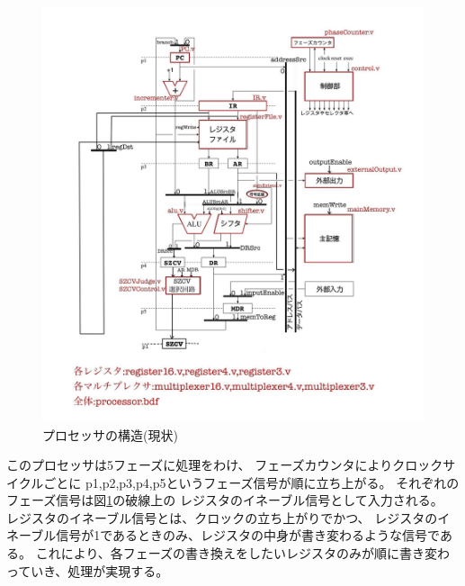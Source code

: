 \documentclass[a4j,titlepage]{jarticle}
\begin{document}
\begin{figure}[H]
    \begin{center}
    \includegraphics[scale = 0.22]{structure0506.jpg}
    \end{center}
    \caption{プロセッサの構造(現状)}
    \label{structure0506}
\end{figure}



このプロセッサは5フェーズに処理をわけ、
フェーズカウンタによりクロックサイクルごとに
p1,p2,p3,p4,p5というフェーズ信号が順に立ち上がる。
それぞれのフェーズ信号は図\ref{structure0506}の破線上の
レジスタのイネーブル信号として入力される。
レジスタのイネーブル信号とは、クロックの立ち上がりでかつ、
レジスタのイネーブル信号が1であるときのみ、レジスタの中身が書き変わるような信号である。
これにより、各フェーズの書き換えをしたいレジスタのみが順に書き変わっていき、処理が実現する。
\end{document}
